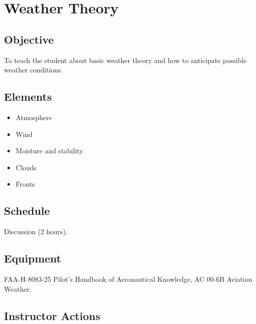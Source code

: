 \section{Weather Theory}

\subsection{Objective}

To teach the student about basic weather theory and how to anticipate possible
weather conditions.

\subsection{Elements}

\begin{itemize}
  \item Atmosphere
  \item Wind
  \item Moisture and stability
  \item Clouds
  \item Fronts
\end{itemize}

\subsection{Schedule}

Discussion (2 hours).

\subsection{Equipment}

FAA-H-8083-25 Pilot's Handbook of Aeronautical Knowledge, AC 00-6B Aviation
Weather.

\subsection{Instructor Actions}

